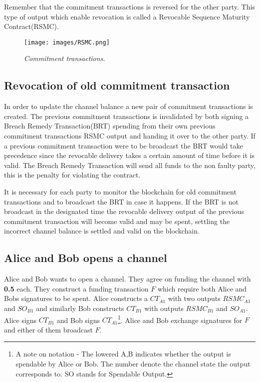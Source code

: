 Remember that the commitment transactions is reversed for the other party. This type of output which enable revocation is called a Revocable Sequence Maturity Contract(\gls{RSMC}).

\begin{figure}[!htb]
			\hspace*{-0.8cm} 
	\centering
	\texttt{[image: images/RSMC.png]}
	\caption{\textit{Commitment transactions. 
	}}
	\label{fig:commitment:tx}
			\hspace*{2mm} 
\end{figure}

\subsection{Revocation of old commitment transaction}

In order to update the channel balance a new pair of commitment transactions is created. The previous commitment transactions is invalidated by both signing a Breach Remedy Transaction(\gls{BRT}) spending from their own previous \gls{commitment transaction}s \gls{RSMC} output and handing it over to the other party. If a previous commitment transaction were to be broadcast the BRT would take precedence since the revocable delivery takes a certain amount of time before it is valid. The Breach Remedy Transaction will send all funds to the non faulty party, this is the penalty for violating the contract.

It is necessary for each party to monitor the \gls{blockchain} for old commitment transactions and to broadcast the \gls{BRT} in case it happens. If the BRT is not broadcast in the designated time the revocable delivery output of the previous commitment transaction will become valid and may be spent, settling the incorrect channel balance is settled and valid on the blockchain.

\subsection{Alice and Bob opens a channel}

Alice and Bob wants to open a channel. They agree on funding the channel with \textbf{0.5\bitcoin} each. They construct a funding transaction $F$ which require both Alice and Bobs signatures to be spent. Alice constructs a $CT_{A1}$ with two outputs $RSMC_{A1}$ and $SO_{B1}$ and similarly Bob constructs $CT_{B1}$ with outputs $RSMC_{B1}$ and $SO_{A1}$. Alice signs $CT_{B1}$ and Bob signs $CT_{A1}$\footnote{A note on notation - The lowered A,B indicates whether the output is spendable by Alice or Bob. The number denote the channel state the output corresponds to. SO stands for Spendable Output.}. Alice and Bob exchange signatures for $F$ and either of them broadcast $F$.

